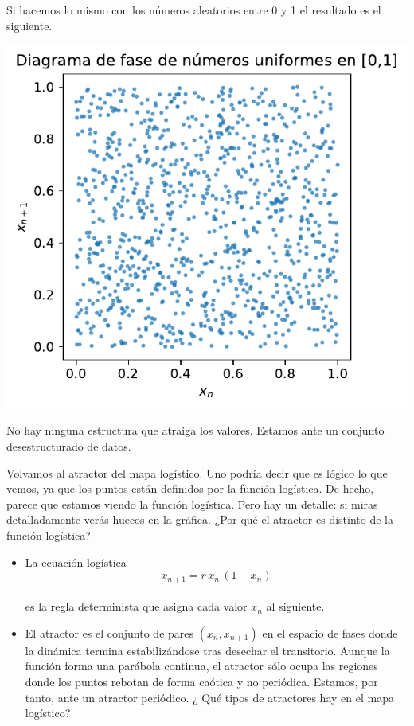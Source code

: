 \documentclass[
  10pt,
  a4paper,
  DIV=11,
  numbers=noendperiod,
  open=any]{scrreprt}
\makeatletter
\newcommand*\pandocbounded[1]{%
  \sbox\pandoc@box{#1}%
  \Gscale@div\@tempa{\textheight}{\dimexpr\ht\pandoc@box+\dp\pandoc@box\relax}%
  \Gscale@div\@tempb{\linewidth}{\wd\pandoc@box}%
  \ifdim\@tempb\p@<\@tempa\p@\let\@tempa\@tempb\fi%
  \ifdim\@tempa\p@<\p@\scalebox{\@tempa}{\usebox\pandoc@box}%
  \else\usebox{\pandoc@box}%
  \fi%
}
\providecommand{\tightlist}{%
  \setlength{\itemsep}{0pt}\setlength{\parskip}{0pt}}
\numberwithin{equation}{chapter}
\numberwithin{equation}{section}
\renewcommand{\[}{\begin{equation}}
\renewcommand{\]}{\end{equation}}
\providecommand{\pandocbounded}[1]{#1}%
\renewcommand{\pandocbounded}[1]{\begingroup\centering #1\par\endgroup}
\makeatother
\begin{document}
Si hacemos lo mismo con los números aleatorios entre 0 y 1 el resultado
es el siguiente.

\pandocbounded{\includegraphics[keepaspectratio]{04-clima/atractor_files/figure-pdf/cell-5-output-1.pdf}}

No hay ninguna estructura que atraiga los valores. Estamos ante un
conjunto desestructurado de datos.

Volvamos al atractor del mapa logístico. Uno podría decir que es lógico
lo que vemos, ya que los puntos están definidos por la función
logística. De hecho, parece que estamos viendo la función logística.
Pero hay un detalle: si miras detalladamente verás huecos en la gráfica.
¿Por qué el atractor es distinto de la función logística?

\begin{itemize}
\tightlist
\item
  La ecuación logística\\
  \[
  x_{n+1} = r\,x_n\,(1 - x_n)
  \]\\
  es la regla determinista que asigna cada valor \(x_n\) al siguiente.
\item
  El atractor es el conjunto de pares \((x_n, x_{n+1})\) en el espacio
  de fases donde la dinámica termina estabilizándose tras desechar el
  transitorio. Aunque la función forma una parábola continua, el
  atractor sólo ocupa las regiones donde los puntos rebotan de forma
  caótica y no periódica. Estamos, por tanto, ante un atractor
  periódico. ¿ Qué tipos de atractores hay en el mapa logístico?
\end{itemize}
\end{document}
